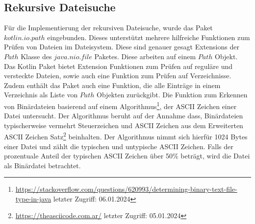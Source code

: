 \documentclass{article}
\begin{document}
\subsection{Rekursive Dateisuche}
Für die Implementierung der rekursiven Dateisuche, wurde das Paket $kotlin.io.path$ eingebunden. Dieses unterstützt mehrere hilfreiche Funktionen zum Prüfen von Dateien im Dateisystem. Diese sind genauer gesagt Extensions der $Path$ Klasse des $java.nio.file$ Paketes. Diese arbeiten auf einem $Path$ Objekt. Das Kotlin Paket bietet Extension Funktionen zum Prüfen auf reguläre und versteckte Dateien, sowie auch eine Funktion zum Prüfen auf Verzeichnisse. Zudem enthält das Paket auch eine Funktion, die alle Einträge in einem Verzeichnis als Liste von $Path$ Objekten zurückgibt. \newline
Die Funktion zum Erkennen von Binärdateien basierend auf einem Algorithmus\footnote{\url{https://stackoverflow.com/questions/620993/determining-binary-text-file-type-in-java} letzter Zugriff: 06.01.2024}, der ASCII Zeichen einer Datei untersucht. Der Algorithmus beruht auf der Annahme dass, Binärdateien typischerweise vermehrt Steuerzeichen und ASCII Zeichen aus dem Erweiterten ASCII Zeichen Satz\footnote{\url{https://theasciicode.com.ar/} letzter Zugriff: 05.01.2024} beinhalten. Der Algorithmus nimmt sich hierfür 1024 Bytes einer Datei und zählt die typischen und untypische ASCII Zeichen. Falls der prozentuale Anteil der typischen ASCII Zeichen über 50\% beträgt, wird die Datei als Binärdatei betrachtet.
\end{document}
